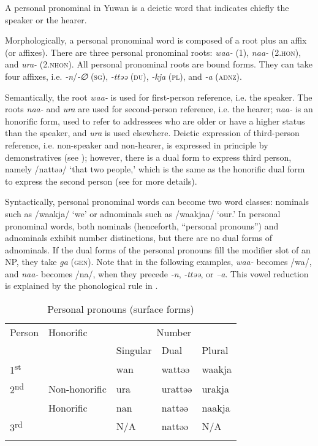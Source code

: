 A personal pronominal in Yuwan is a deictic word that indicates chiefly the speaker or the hearer.

Morphologically, a personal pronominal word is composed of a root plus an affix (or affixes). There are three personal pronominal roots: \textit{waa-} (1), \textit{naa-} (2.\textsc{hon}), and \textit{ura-} (2.\textsc{nhon}). All personal pronominal roots are bound forms. They can take four affixes, i.e. \textit{{}-n}/\textit{{}-∅} (\textsc{sg}), \textit{{}-ttəə} (\textsc{du}), \textit{{}-kja} (\textsc{pl}), and \textit{{}-a} (\textsc{adnz}).

Semantically, the root \textit{waa-} is used for first-person reference, i.e. the speaker. The roots \textit{naa-} and \textit{ura} are used for second-person reference, i.e. the hearer; \textit{naa-} is an honorific form, used to refer to addressees who are older or have a higher status than the speaker, and \textit{ura} is used elsewhere. Deictic expression of third-person reference, i.e. non-speaker and non-hearer, is expressed in principle by demonstratives (see ); however, there is a dual form to express third person, namely /nattəə/ ‘that two people,’ which is the same as the honorific dual form to express the second person (see  for more details).

Syntactically, personal pronominal words can become two word classes: nominals such as /waakja/ ‘we’ or adnominals such as /waakjaa/ ‘our.’ In personal pronominal words, both nominals (henceforth, “personal pronouns”) and adnominals exhibit number distinctions, but there are no dual forms of adnominals. If the dual forms of the personal pronouns fill the modifier slot of an NP, they take \textit{ga} (\textsc{gen}). Note that in the following examples, \textit{waa-} becomes /wa/, and \textit{naa-} becomes /na/, when they precede \textit{{}-n}, \textit{{}-ttəə}, or \textit{–a}. This vowel reduction is explained by the phonological rule in .

\begin{table}
\caption{\label{tab:key:31}Personal pronouns (surface forms)}
\begin{tabular}{lllll}
\lsptoprule
Person & Honorific & \multicolumn{3}{c}{Number}\\\cmidrule(lr){3-5}
       &           &  Singular & Dual & Plural\\\midrule
1\textsuperscript{st}  &                & wan   & wattəə  & waakja\\
2\textsuperscript{nd}  &  Non-honorific & ura   & urattəə & urakja\\
                       &  Honorific     & nan   & nattəə  & naakja\\
3\textsuperscript{rd}  &                & N/A   & nattəə  & N/A   \\
\lspbottomrule
\end{tabular}
\end{table}

